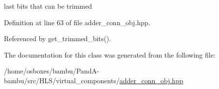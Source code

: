 last bits that can be trimmed 



Definition at line 63 of file adder\+\_\+conn\+\_\+obj.\+hpp.



Referenced by get\+\_\+trimmed\+\_\+bits().



The documentation for this class was generated from the following file\+:\begin{DoxyCompactItemize}
\item 
/home/osboxes/bambu/\+Pand\+A-\/bambu/src/\+H\+L\+S/virtual\+\_\+components/\hyperlink{adder__conn__obj_8hpp}{adder\+\_\+conn\+\_\+obj.\+hpp}\end{DoxyCompactItemize}
